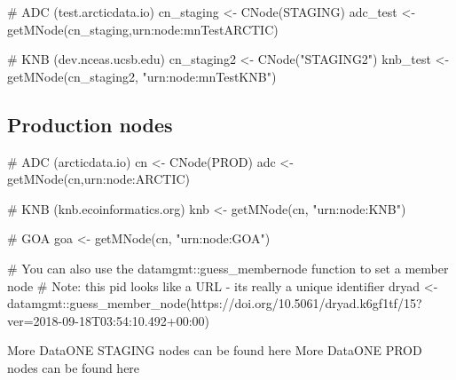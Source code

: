 \documentclass[
  letterpaper,
  DIV=11,
  numbers=noendperiod]{scrreprt}
\newenvironment{Shaded}{\begin{snugshade}}{\end{snugshade}}
\newcommand{\CommentTok}[1]{\textcolor[rgb]{0.37,0.37,0.37}{#1}}
\newcommand{\FunctionTok}[1]{\textcolor[rgb]{0.28,0.35,0.67}{#1}}
\newcommand{\NormalTok}[1]{\textcolor[rgb]{0.00,0.23,0.31}{#1}}
\newcommand{\OtherTok}[1]{\textcolor[rgb]{0.00,0.23,0.31}{#1}}
\newcommand{\SpecialCharTok}[1]{\textcolor[rgb]{0.37,0.37,0.37}{#1}}
\newcommand{\StringTok}[1]{\textcolor[rgb]{0.13,0.47,0.30}{#1}}
\begin{document}
\begin{Shaded}
\begin{Highlighting}[]
\CommentTok{\# ADC (test.arcticdata.io)}
\NormalTok{cn\_staging }\OtherTok{\textless{}{-}} \FunctionTok{CNode}\NormalTok{(}\StringTok{\textquotesingle{}STAGING\textquotesingle{}}\NormalTok{)}
\NormalTok{adc\_test }\OtherTok{\textless{}{-}} \FunctionTok{getMNode}\NormalTok{(cn\_staging,}\StringTok{\textquotesingle{}urn:node:mnTestARCTIC\textquotesingle{}}\NormalTok{)}

\CommentTok{\# KNB (dev.nceas.ucsb.edu)}
\NormalTok{cn\_staging2 }\OtherTok{\textless{}{-}} \FunctionTok{CNode}\NormalTok{(}\StringTok{"STAGING2"}\NormalTok{)}
\NormalTok{knb\_test }\OtherTok{\textless{}{-}} \FunctionTok{getMNode}\NormalTok{(cn\_staging2, }\StringTok{"urn:node:mnTestKNB"}\NormalTok{)}
\end{Highlighting}
\end{Shaded}

\hypertarget{production-nodes}{%
\subsection{Production nodes}\label{production-nodes}}

\begin{Shaded}
\begin{Highlighting}[]
\CommentTok{\# ADC (arcticdata.io)}
\NormalTok{cn }\OtherTok{\textless{}{-}} \FunctionTok{CNode}\NormalTok{(}\StringTok{\textquotesingle{}PROD\textquotesingle{}}\NormalTok{)}
\NormalTok{adc }\OtherTok{\textless{}{-}} \FunctionTok{getMNode}\NormalTok{(cn,}\StringTok{\textquotesingle{}urn:node:ARCTIC\textquotesingle{}}\NormalTok{)}

\CommentTok{\# KNB (knb.ecoinformatics.org)}
\NormalTok{knb }\OtherTok{\textless{}{-}} \FunctionTok{getMNode}\NormalTok{(cn, }\StringTok{"urn:node:KNB"}\NormalTok{)}

\CommentTok{\# GOA }
\NormalTok{goa }\OtherTok{\textless{}{-}} \FunctionTok{getMNode}\NormalTok{(cn, }\StringTok{"urn:node:GOA"}\NormalTok{)}

\CommentTok{\# You can also use the datamgmt::guess\_membernode function to set a member node}
\CommentTok{\# Note: this pid looks like a URL {-} it\textquotesingle{}s really a unique identifier}
\NormalTok{dryad }\OtherTok{\textless{}{-}}\NormalTok{ datamgmt}\SpecialCharTok{::}\FunctionTok{guess\_member\_node}\NormalTok{(}\StringTok{\textquotesingle{}https://doi.org/10.5061/dryad.k6gf1tf/15?ver=2018{-}09{-}18T03:54:10.492+00:00\textquotesingle{}}\NormalTok{)}
\end{Highlighting}
\end{Shaded}

More DataONE STAGING nodes can be found here More DataONE PROD nodes can
be found here
\end{document}
